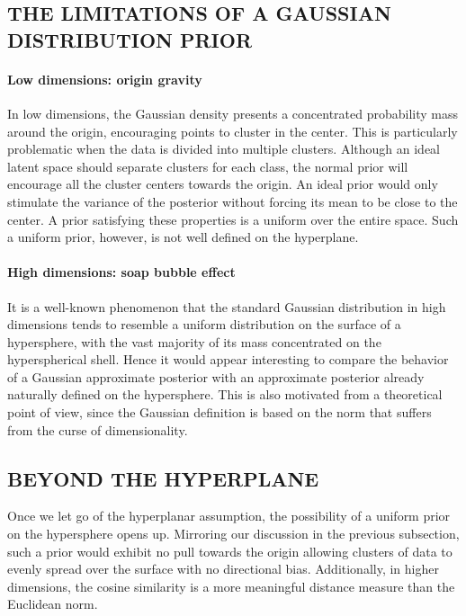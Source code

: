 \documentclass[letterpaper]{article}
\begin{document}
\subsection{THE LIMITATIONS OF A GAUSSIAN DISTRIBUTION PRIOR} \label{subsec:lim-gaussian-prior}

\paragraph{Low dimensions: origin gravity} \label{par:lowdim}
In low dimensions, the Gaussian density presents a concentrated probability mass around the origin, encouraging points to cluster in the center. This is particularly problematic when the data is divided into multiple clusters. Although an ideal latent space should separate clusters for each class, the normal prior will encourage all the cluster centers towards the origin. An ideal prior would only stimulate the variance of the posterior without forcing its mean to be close to the center. A prior satisfying these properties is a uniform over the entire space. Such a uniform prior, however, is not well defined on the hyperplane.
 
\paragraph{High dimensions: soap bubble effect} \label{par:highdim}
It is a well-known phenomenon that the standard Gaussian distribution in high dimensions tends to resemble a uniform distribution on the surface of a hypersphere, with the vast majority of its mass concentrated on the hyperspherical shell. Hence it would appear interesting to compare the behavior of a Gaussian approximate posterior with an approximate posterior already naturally defined on the hypersphere. This is also motivated from a theoretical point of view, since the Gaussian definition is based on the  norm that suffers from the curse of dimensionality.

\subsection{BEYOND THE HYPERPLANE} \label{subsec:beyond-hyperplanes}
Once we let go of the hyperplanar assumption, the possibility of a uniform prior on the hypersphere opens up. Mirroring our discussion in the previous subsection, such a prior would exhibit no pull towards the origin allowing clusters of data to evenly spread over the surface with no directional bias. Additionally, in higher dimensions, the cosine similarity is a more meaningful distance measure than the Euclidean norm.
 
\end{document}
